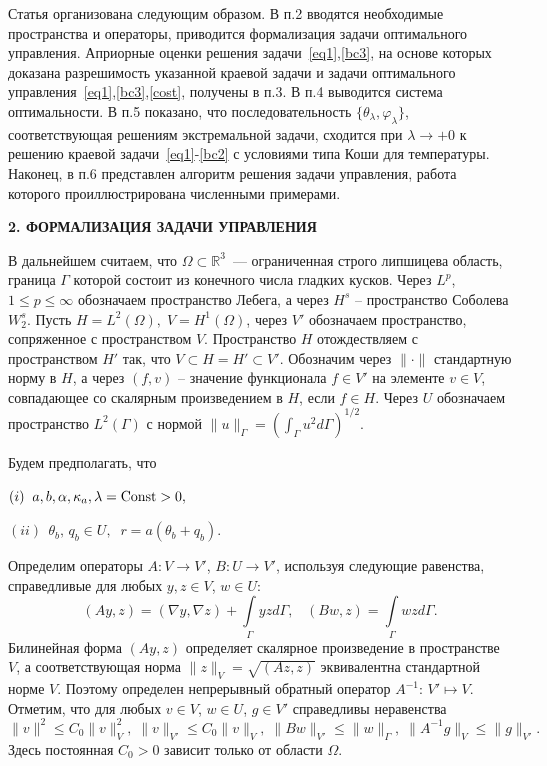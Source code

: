 \documentclass[12pt]{article}
\begin{document}
Статья организована следующим образом. В п.2 вводятся необходимые пространства и операторы, приводится
формализация задачи оптимального управления.
Априорные оценки решения задачи~\eqref{eq1},\eqref{bc3}, на основе которых
    доказана разрешимость указанной краевой задачи  и задачи оптимального управления~\eqref{eq1},\eqref{bc3},\eqref{cost}, получены в п.3.
В п.4 выводится система оптимальности. В п.5 показано, что
    последовательность $\{\theta_\lambda,\varphi_\lambda\}$, соответствующая решениям
    экстремальной задачи,
    сходится при $\lambda\to +0$ к решению краевой задачи~\eqref{eq1}-\eqref{bc2} с условиями типа Коши для температуры.
Наконец, в п.6 представлен алгоритм решения задачи управления, работа которого проиллюстрирована численными примерами.


    \begin{center}
        \textbf{2. ФОРМАЛИЗАЦИЯ ЗАДАЧИ УПРАВЛЕНИЯ}
    \end{center}

    В дальнейшем считаем, что $\Omega\subset \mathbb{R}^3$~--- ограниченная строго липшицева
    область, граница $\Gamma$ которой состоит из конечного числа
    гладких кусков.
    Через $L^p$, $1 \leq p \leq \infty$ обозначаем
    пространство Лебега, а через $H^s$ -- пространство Соболева $W^s_2$.
    Пусть $H = L^2(\Omega), \; V = H^1(\Omega)$, через $V'$ обозначаем
    пространство, сопряженное с пространством $V$.
    Пространство $H$ отождествляем с пространством $H'$ так, что $V \subset H = H' \subset V'$.
    Обозначим через $\|\cdot\|$ стандартную норму в $H$, а через
    $(f,v)$ -- значение функционала $f\in V'$ на элементе $v\in V$,
    совпадающее со скалярным произведением в $H$, если $f\in H$.
    Через $U$ обозначаем пространство $L^2(\Gamma)$ с нормой
    $\|u\|_\Gamma=\left(\int_\Gamma u^2d\Gamma\right)^{1/2}.$



    Будем предполагать, что

    $(i) \;\; a,b,\alpha,\kappa_a, \lambda ={\rm Const}> 0 ,$

    $(ii) \;\, \theta_b, \,q_b \in U,\;\; r=a(\theta_b+q_b).$


    Определим операторы $A\colon V \to V'$, $B\colon U \to V'$, используя
    следующие равенства, справедливые для любых $y,z \in V$, $w\in U$:
    \[
        (Ay,z) = (\nabla y, \nabla z) +
        \int\limits_{\Gamma}yz d\Gamma, \;\;\; (Bw, z)
        = \int\limits_{\Gamma}wz d\Gamma.
    \]
    Билинейная форма $(Ay,z)$ определяет скалярное произведение
    в пространстве $V$, а соответствующая норма $\|z\|_V=\sqrt{(Az,z)}$ эквивалентна
    стандартной норме $V$.
    Поэтому определен непрерывный обратный оператор
    $A^{-1}:\,V'\mapsto V.$ Отметим, что для любых
    $v\in V$, $w\in U$, $g\in V'$ справедливы неравенства
    \begin{equation}
        \label{E}
        \|v\|^2\leq C_0\|v\|^2_V,\; \|v\|_{V'}\leq C_0\|v\|_V,\; \|Bw\|_{V'}\leq \|w\|_\Gamma,\;
        \|A^{-1}g\|_{V}\leq \|g\|_{V'}.
    \end{equation}
    Здесь постоянная $C_0>0$ зависит только от области $\Omega.$
\end{document}
